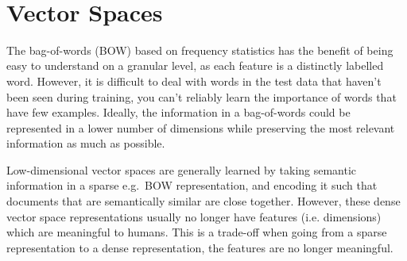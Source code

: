 

\

\section{Vector Spaces}\label{ch2:vectorspaces}



The bag-of-words (BOW) based on frequency statistics has the benefit of being easy to understand on a granular level, as each feature is a distinctly labelled word. However, it is difficult to deal with words in the test data that  haven't been seen during training, you can't reliably learn the importance of words that have few examples. Ideally, the  information in a bag-of-words could be represented in a lower number of dimensions while preserving the most relevant information as much as possible.%


Low-dimensional vector spaces are generally learned by taking  semantic information  in a sparse e.g.\ BOW representation, and encoding it  such that documents that are semantically similar are close together. However, these dense vector space representations usually no longer have features (i.e. dimensions) which are meaningful to humans. This is a trade-off when going from a sparse representation to a dense representation, the features are no longer meaningful. 

